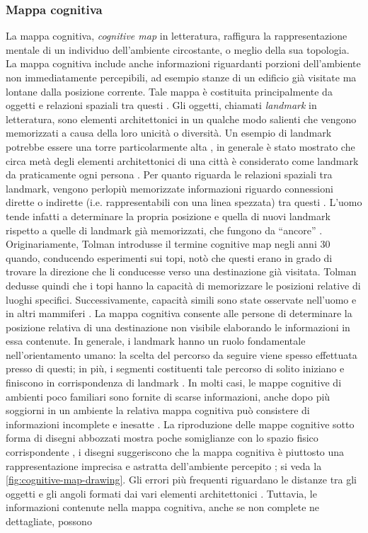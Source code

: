 \documentclass[12pt,a4paper,openright,oneside]{book}
\begin{document}
\subsubsection{Mappa cognitiva} 
La mappa cognitiva, \emph{cognitive map} in letteratura, raffigura la rappresentazione mentale di un individuo dell’ambiente circostante, o meglio della sua topologia. La mappa cognitiva include anche informazioni riguardanti porzioni dell’ambiente non immediatamente percepibili, ad esempio stanze di un edificio già visitate ma lontane dalla posizione corrente. Tale mappa è costituita principalmente da oggetti e relazioni spaziali tra questi \cite{Grling1986ReferenceSI, Golledge1999}. Gli oggetti, chiamati \emph{landmark} in letteratura, sono elementi architettonici in un qualche modo salienti che vengono memorizzati a causa della loro unicità o diversità. Un esempio di landmark potrebbe essere una torre particolarmente alta \cite{Golledge1999}, in generale è stato mostrato che circa metà degli elementi architettonici di una città è considerato come landmark da praticamente ogni persona \cite{Golledge1978}. Per quanto riguarda le relazioni spaziali tra landmark, vengono perlopiù memorizzate informazioni riguardo connessioni dirette o indirette (i.e. rappresentabili con una linea spezzata) tra questi \cite{Golledge1999}. L’uomo tende infatti a determinare la propria posizione e quella di nuovi landmark rispetto a quelle di landmark già memorizzati, che fungono da “ancore” \cite{Golledge1999}. Originariamente, Tolman introdusse il termine cognitive map negli anni 30 quando, conducendo esperimenti sui topi, notò che questi erano in grado di trovare la direzione che li conducesse verso una destinazione già visitata. Tolman \cite{TolmanCognitiveMapRats1948} dedusse quindi che i topi hanno la capacità di memorizzare le posizioni relative di luoghi specifici. Successivamente, capacità simili sono state osservate nell’uomo e in altri mammiferi \cite{EkstromCellularNetworks2003, Ekstrom2010}. La mappa cognitiva consente alle persone di determinare la posizione relativa di una destinazione non visibile elaborando le informazioni in essa contenute. In generale, i landmark hanno un ruolo fondamentale nell’orientamento umano: la scelta del percorso da seguire viene spesso effettuata presso di questi; in più, i segmenti costituenti tale percorso di solito iniziano e finiscono in corrispondenza di landmark \cite{Golledge1999}. In molti casi, le mappe cognitive di ambienti poco familiari sono fornite di scarse informazioni, anche dopo più soggiorni in un ambiente la relativa mappa cognitiva può consistere di informazioni incomplete e inesatte \cite{Golledge1999}. La riproduzione delle mappe cognitive sotto forma di disegni abbozzati mostra poche somiglianze con lo spazio fisico corrispondente \cite{Golledge1999}, i disegni suggeriscono che la mappa cognitiva è piuttosto una rappresentazione imprecisa e astratta dell'ambiente percepito \cite{Carlson2010}; si veda la \cref{fig:cognitive-map-drawing}. Gli errori più frequenti riguardano le distanze tra gli oggetti e gli angoli formati dai vari elementi architettonici  \cite{Golledge1999, Ellard2009}. Tuttavia, le informazioni contenute nella mappa cognitiva, anche se non complete ne dettagliate, possono 
\end{document}
